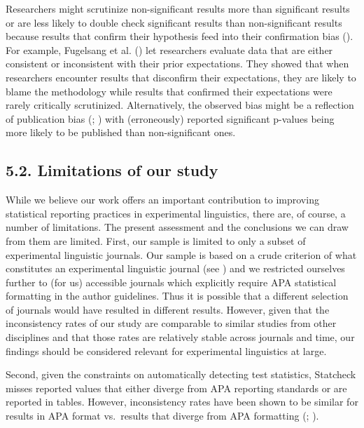 \documentclass[
  doc,
  longtable,
  nolmodern,
  notxfonts,
  notimes,
  colorlinks=true,linkcolor=blue,citecolor=blue,urlcolor=blue]{apa7}
\begin{document}
Researchers might scrutinize non-significant results more than
significant results or are less likely to double check significant
results than non-significant results because results that confirm their
hypothesis feed into their confirmation bias
(). For
example, Fugelsang et al. () let
researchers evaluate data that are either consistent or inconsistent
with their prior expectations. They showed that when researchers
encounter results that disconfirm their expectations, they are likely to
blame the methodology while results that confirmed their expectations
were rarely critically scrutinized. Alternatively, the observed bias
might be a reflection of publication bias
(;
) with
(erroneously) reported significant p-values being more likely to be
published than non-significant ones.

\subsection{5.2. Limitations of our
study}\label{limitations-of-our-study}

While we believe our work offers an important contribution to improving
statistical reporting practices in experimental linguistics, there are,
of course, a number of limitations. The present assessment and the
conclusions we can draw from them are limited. First, our sample is
limited to only a subset of experimental linguistic journals. Our sample
is based on a crude criterion of what constitutes an experimental
linguistic journal (see ) and we restricted ourselves further to (for us)
accessible journals which explicitly require APA statistical formatting
in the author guidelines. Thus it is possible that a different selection
of journals would have resulted in different results. However, given
that the inconsistency rates of our study are comparable to similar
studies from other disciplines and that those rates are relatively
stable across journals and time, our findings should be considered
relevant for experimental linguistics at large.

Second, given the constraints on automatically detecting test
statistics, Statcheck misses reported values that either diverge from
APA reporting standards or are reported in tables. However,
inconsistency rates have been shown to be similar for results in APA
format vs.~results that diverge from APA formatting
(;
).
\end{document}
